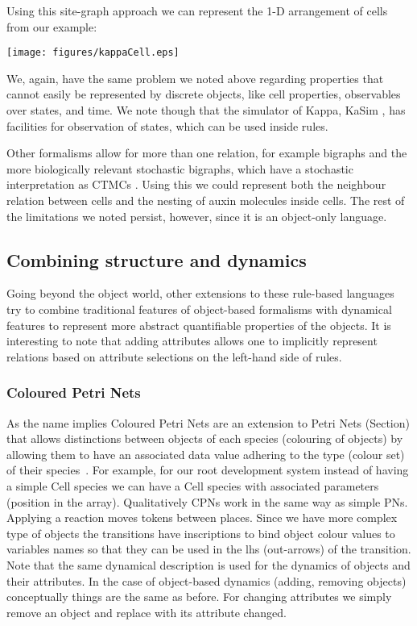 Using this site-graph approach we can represent the 1-D arrangement of cells from
our example:
\begin{center}
    \texttt{[image: figures/kappaCell.eps]}
\end{center}
We, again, have the same problem we noted above regarding properties that cannot
easily be represented by discrete objects, like cell properties, observables
over states, and time. We note though that the simulator of Kappa, KaSim
\citep{KaSimManual2014}, has facilities for observation of states, which can
be used inside rules.

Other formalisms allow for more than one relation, for example bigraphs
\citep{milner1999communicating} and the more biologically relevant stochastic
bigraphs, which have a stochastic interpretation as CTMCs
\citep{krivine_stochastic_2008}. Using this we could represent both the
neighbour relation between cells and the nesting of auxin molecules inside
cells. The rest of the limitations we noted persist, however, since it is an
object-only language.

\subsection{Combining structure and dynamics}
\label{subsec:structDynLangs}
Going beyond the object world, other extensions to these rule-based languages
try to combine traditional features of object-based formalisms with dynamical
features to represent more abstract quantifiable properties of the objects.
It is interesting to note that adding attributes allows one to implicitly represent
relations based on attribute selections on the left-hand side of rules.

\subsubsection*{Coloured Petri Nets}
As the name implies Coloured Petri Nets are an extension to Petri Nets (Section)
that allows distinctions between objects of each species (colouring of objects)
by allowing them to have an associated data value adhering to the type (colour
set) of their species~\citep{jensen_coloured_1987}. For example, for our root
development system instead of having a simple $\mathrm{Cell}$ species we can
have a $\mathrm{Cell}$ species with associated parameters (\eg position in the
array). Qualitatively CPNs work in the same way as simple PNs. Applying a
reaction moves tokens between places. Since we have more complex type of objects
the transitions have inscriptions to bind object colour values to variables
names so that they can be used in the lhs (out-arrows) of the transition. Note
that the same dynamical description is used for the dynamics of objects and
their attributes. In the case of object-based dynamics (adding, removing
objects) conceptually things are the same as before. For changing attributes we
simply remove an object and replace with its attribute changed.

